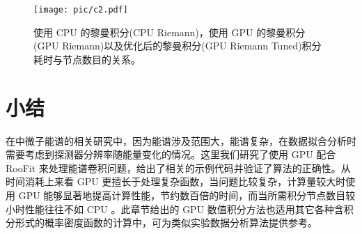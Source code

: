 \begin{figure}
    \centering
    \texttt{[image: pic/c2.pdf]}
    \caption{ 使用 CPU 的黎曼积分(CPU Riemann)，使用 GPU 的黎曼积分(GPU Riemann)以及优化后的黎曼积分(GPU Riemann Tuned)积分耗时与节点数目的关系。}
    \label{fig:cuda_3}
\end{figure}

\section{小结}

在中微子能谱的相关研究中，因为能谱涉及范围大，能谱复杂，在数据拟合分析时需要考虑到探测器分辨率随能量变化的情况。这里我们研究了使用 GPU 配合 RooFit 来处理能谱卷积问题，给出了相关的示例代码并验证了算法的正确性。从时间消耗上来看 GPU 更擅长于处理复杂函数，当问题比较复杂，计算量较大时使用 GPU 能够显著地提高计算性能，节约数百倍的时间，而当所需积分节点数目较小时性能往往不如 CPU 。此章节给出的 GPU 数值积分方法也适用其它各种含积分形式的概率密度函数的计算中，可为类似实验数据分析算法提供参考。